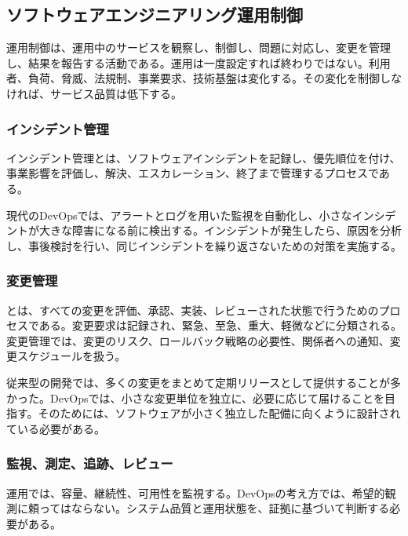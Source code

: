 \subsection{ソフトウェアエンジニアリング運用制御}

運用制御は、運用中のサービスを観察し、制御し、問題に対応し、変更を管理し、結果を報告する活動である。運用は一度設定すれば終わりではない。利用者、負荷、脅威、法規制、事業要求、技術基盤は変化する。その変化を制御しなければ、サービス品質は低下する。

\subsubsection{インシデント管理}

インシデント管理とは、ソフトウェアインシデントを記録し、優先順位を付け、事業影響を評価し、解決、エスカレーション、終了まで管理するプロセスである。

現代のDevOpsでは、アラートとログを用いた監視を自動化し、小さなインシデントが大きな障害になる前に検出する。インシデントが発生したら、原因を分析し、事後検討を行い、同じインシデントを繰り返さないための対策を実施する。

\subsubsection{変更管理}

とは、すべての変更を評価、承認、実装、レビューされた状態で行うためのプロセスである。変更要求は記録され、緊急、至急、重大、軽微などに分類される。変更管理では、変更のリスク、ロールバック戦略の必要性、関係者への通知、変更スケジュールを扱う。

従来型の開発では、多くの変更をまとめて定期リリースとして提供することが多かった。DevOpsでは、小さな変更単位を独立に、必要に応じて届けることを目指す。そのためには、ソフトウェアが小さく独立した配備に向くように設計されている必要がある。

\subsubsection{監視、測定、追跡、レビュー}

運用では、容量、継続性、可用性を監視する。DevOpsの考え方では、希望的観測に頼ってはならない。システム品質と運用状態を、証拠に基づいて判断する必要がある。

